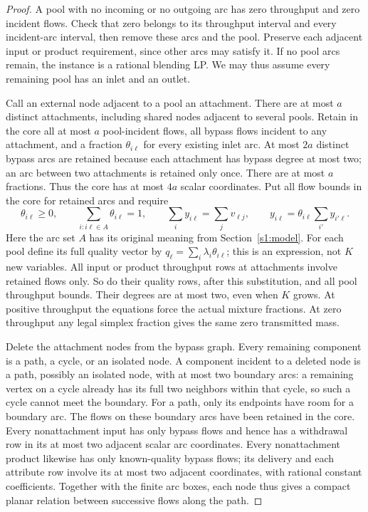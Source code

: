 \begin{proof}
A pool with no incoming or no outgoing arc has zero throughput and
zero incident flows. Check that zero belongs to its throughput interval
and every incident-arc interval, then remove these arcs and the pool.
Preserve each adjacent input or product requirement, since other arcs may satisfy
it. If no pool arcs remain, the instance is a rational blending LP.
We may thus assume every remaining pool has an inlet and an outlet.

Call an external node adjacent to a pool an attachment. There are
at most $a$ distinct attachments, including shared nodes adjacent to
several pools. Retain in the core all at most $a$ pool-incident flows,
all bypass flows incident to any attachment, and a fraction
$\theta_{i\ell}$ for every existing inlet arc. At most $2a$ distinct
bypass arcs are retained because each attachment has bypass degree
at most two; an arc between two attachments is retained only once.
There are at most $a$ fractions. Thus the core has at most $4a$
scalar coordinates. Put all flow bounds in the core for retained
arcs and require
\begin{equation}
 \theta_{i\ell}\ge0,\qquad
 \sum_{i:i\ell\in A}\theta_{i\ell}=1,\qquad
 \sum_i y_{i\ell}=\sum_jv_{\ell j},\qquad
 y_{i\ell}=\theta_{i\ell}\sum_{i'}y_{i'\ell}.
 \label{s4:attachment-fractions}
\end{equation}
Here the arc set $A$ has its original meaning from Section~\ref{s1:model}.
For each pool define its full quality vector by
$q_\ell=\sum_i\lambda_i\theta_{i\ell}$; this is an expression, not
$K$ new variables. All input or product throughput rows at attachments
involve retained flows only. So do their quality rows, after this
substitution, and all pool throughput bounds. Their degrees are at
most two, even when $K$ grows. At positive throughput the equations
force the actual mixture fractions. At zero throughput any legal
simplex fraction gives the same zero transmitted mass.

Delete the attachment nodes from the bypass graph. Every remaining
component is a path, a cycle, or an isolated node. A component incident
to a deleted node is a path, possibly an isolated node, with at most
two boundary arcs: a remaining vertex on a cycle already has its full
two neighbors within that cycle, so such a cycle cannot meet the
boundary. For a path, only its endpoints have room for a boundary
arc. The flows on these boundary arcs have been retained in the core.
Every nonattachment input has only bypass flows and hence has a
withdrawal row in its at most two adjacent scalar arc coordinates.
Every nonattachment product likewise has only known-quality bypass
flows; its delivery and each attribute row involve its at most two
adjacent coordinates, with rational constant coefficients. Together
with the finite arc boxes, each node thus gives a compact planar
relation between successive flows along the path.


\end{proof}
